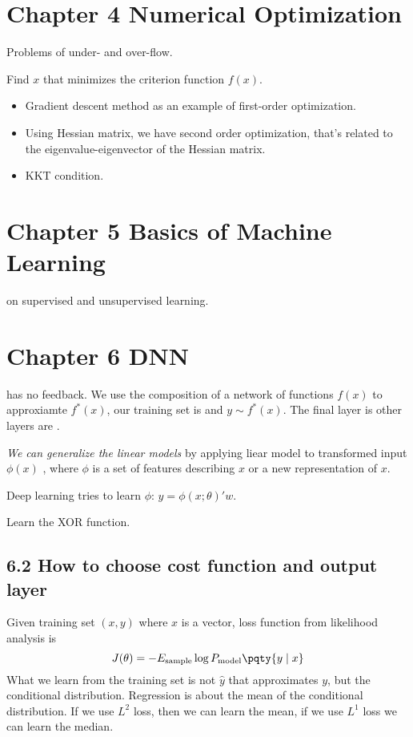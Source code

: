 \documentclass[12pt]{article}
\begin{document}
\section{Chapter 4 Numerical Optimization}
Problems of under- and over-flow. 

Find \(x\) that minimizes the criterion function \(f(x)\). 

\begin{itemize}
    \item Gradient descent method as an example of first-order optimization.
    \item Using Hessian matrix, we have second order optimization, that's related to the eigenvalue-eigenvector of the Hessian matrix. 
    \item KKT condition. 
\end{itemize}

\section{Chapter 5 Basics of Machine Learning}
 on supervised and unsupervised learning. 

\section{Chapter 6 DNN}
 has no feedback. We use the composition of a network of functions \(f(x)\) to approxiamte \(f^{*}(x)\), our training set is  and  \(y \sim f^{*}(x)\). The final layer is  other layers are . 

\textit{We can generalize the linear models} by applying liear model to transformed input \(\phi(x)\) , where \(\phi\) is a set of features describing \(x\) or a new representation of \(x\).

Deep learning tries to learn \(\phi\): 
\(y =\phi(x; \theta)' w\).

\begin{example}
    Learn the XOR function. 
\end{example}

\subsection{6.2 How to choose cost function and output layer}
    Given training set \((x, y)\) where \(x\) is a vector, loss function from likelihood analysis is 
    \begin{equation*}
        J(\theta) = - E_{\text{sample}} \log P_{\text{model}} \pqty{y \mid x}
    \end{equation*}
    What we learn from the training set is not \(\hat{y}\) that approximates \(y\), but the conditional distribution. Regression is about the mean of the conditional distribution. 
    If we use \(L^{2}\) loss, then we can learn the mean, if we use \(L^{1}\) loss we can learn the median. 
    
\end{document}
